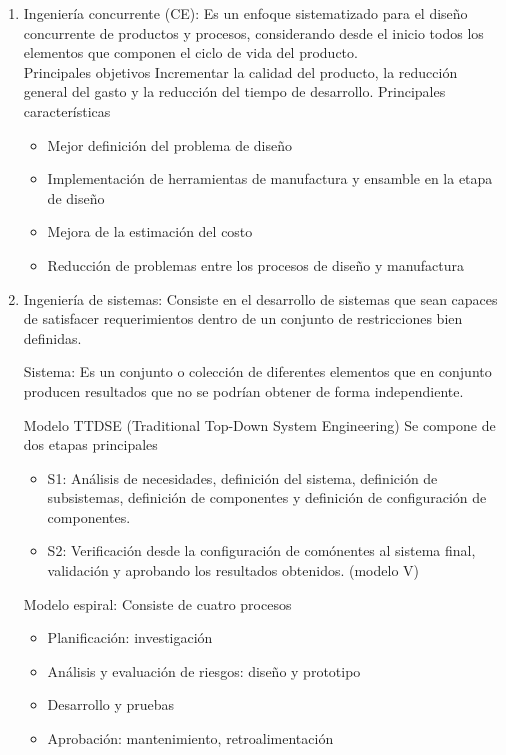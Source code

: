 \begin{enumerate}
    \item Ingeniería concurrente (CE): Es un enfoque sistematizado para el diseño concurrente de productos y procesos, considerando desde el inicio todos los elementos que componen el ciclo de vida del producto. \\


    Principales objetivos
    Incrementar la calidad del producto, la reducción general del gasto y la reducción del tiempo de desarrollo. 
    Principales características
    
    \begin{itemize}
        \item Mejor definición del problema de diseño 
        \item Implementación de herramientas de manufactura y ensamble en la etapa de diseño
        \item Mejora de la estimación del costo
        \item Reducción de problemas entre los procesos de diseño y manufactura
    \end{itemize}

    \item Ingeniería de sistemas: Consiste en el desarrollo de sistemas que sean capaces de satisfacer requerimientos dentro de un conjunto de restricciones bien definidas.
    
    Sistema: Es un conjunto o colección de diferentes elementos que en conjunto producen resultados que no se podrían obtener de forma independiente.

    Modelo TTDSE (Traditional Top-Down System Engineering) 
    Se compone de dos etapas principales
    
    \begin{itemize}
        \item S1: Análisis de necesidades, definición del sistema, definición de subsistemas, definición de componentes y definición de configuración de componentes.
        \item S2: Verificación desde la configuración de comónentes al sistema final, validación y aprobando los resultados obtenidos. (modelo V)
    \end{itemize}
    
    Modelo espiral: Consiste de cuatro procesos
    
    \begin{itemize}
        \item Planificación: investigación 
        \item Análisis y evaluación de riesgos: diseño y prototipo
        \item Desarrollo y pruebas
        \item Aprobación: mantenimiento, retroalimentación 
    \end{itemize}


\end{enumerate}
